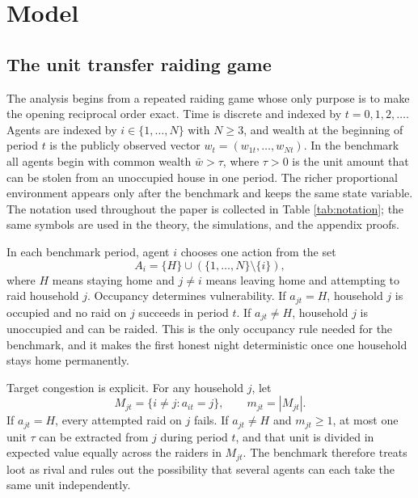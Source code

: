 \section{Model}
\label{sec:model}

\subsection{The unit transfer raiding game}

The analysis begins from a repeated raiding game whose only purpose is to make the opening reciprocal order exact. Time is discrete and indexed by $t = 0,1,2,\dots$. Agents are indexed by $i \in \{1,\dots,N\}$ with $N \ge 3$, and wealth at the beginning of period $t$ is the publicly observed vector $w_t = (w_{1t},\dots,w_{Nt})$. In the benchmark all agents begin with common wealth $\bar{w} > \tau$, where $\tau > 0$ is the unit amount that can be stolen from an unoccupied house in one period. The richer proportional environment appears only after the benchmark and keeps the same state variable. The notation used throughout the paper is collected in Table \ref{tab:notation}; the same symbols are used in the theory, the simulations, and the appendix proofs.

\begin{table}[tbp]
    \centering
    \caption{Notation. The table collects the state variables, contract terms, and regime objects used throughout the theory and simulation sections.}
    \label{tab:notation}
    
\end{table}

In each benchmark period, agent $i$ chooses one action from the set
\[
A_i = \{H\} \cup \left(\{1,\dots,N\}\setminus\{i\}\right),
\]
where $H$ means staying home and $j \neq i$ means leaving home and attempting to raid household $j$. Occupancy determines vulnerability. If $a_{jt}=H$, household $j$ is occupied and no raid on $j$ succeeds in period $t$. If $a_{jt}\neq H$, household $j$ is unoccupied and can be raided. This is the only occupancy rule needed for the benchmark, and it makes the first honest night deterministic once one household stays home permanently.

Target congestion is explicit. For any household $j$, let
\[
M_{jt} = \{i \neq j : a_{it}=j\},
\qquad
m_{jt} = |M_{jt}|.
\]
If $a_{jt}=H$, every attempted raid on $j$ fails. If $a_{jt}\neq H$ and $m_{jt}\ge 1$, at most one unit $\tau$ can be extracted from $j$ during period $t$, and that unit is divided in expected value equally across the raiders in $M_{jt}$. The benchmark therefore treats loot as rival and rules out the possibility that several agents can each take the same unit independently.

